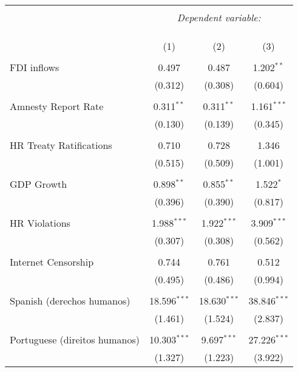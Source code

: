 
\begin{table}[!htbp] \centering 
  \caption{} 
  \label{} 
\begin{tabular}{@{\extracolsep{5pt}}lccc} 
\\[-1.8ex]\hline 
\hline \\[-1.8ex] 
 & \multicolumn{3}{c}{\textit{Dependent variable:}} \\ 
\cline{2-4} 
\\[-1.8ex] & \multicolumn{3}{c}{ } \\ 
\\[-1.8ex] & (1) & (2) & (3)\\ 
\hline \\[-1.8ex] 
 FDI inflows & 0.497 & 0.487 & 1.202$^{**}$ \\ 
  & (0.312) & (0.308) & (0.604) \\ 
  & & & \\ 
 Amnesty Report Rate & 0.311$^{**}$ & 0.311$^{**}$ & 1.161$^{***}$ \\ 
  & (0.130) & (0.139) & (0.345) \\ 
  & & & \\ 
 HR Treaty Ratifications & 0.710 & 0.728 & 1.346 \\ 
  & (0.515) & (0.509) & (1.001) \\ 
  & & & \\ 
 GDP Growth & 0.898$^{**}$ & 0.855$^{**}$ & 1.522$^{*}$ \\ 
  & (0.396) & (0.390) & (0.817) \\ 
  & & & \\ 
 HR Violations & 1.988$^{***}$ & 1.922$^{***}$ & 3.909$^{***}$ \\ 
  & (0.307) & (0.308) & (0.562) \\ 
  & & & \\ 
 Internet Censorship & 0.744 & 0.761 & 0.512 \\ 
  & (0.495) & (0.486) & (0.994) \\ 
  & & & \\ 
 Spanish (derechos humanos) & 18.596$^{***}$ & 18.630$^{***}$ & 38.846$^{***}$ \\ 
  & (1.461) & (1.524) & (2.837) \\ 
  & & & \\ 
 Portuguese (direitos humanos) & 10.303$^{***}$ & 9.697$^{***}$ & 27.226$^{***}$ \\ 
  & (1.327) & (1.223) & (3.922) \\ 

\end{tabular}
\end{table}
